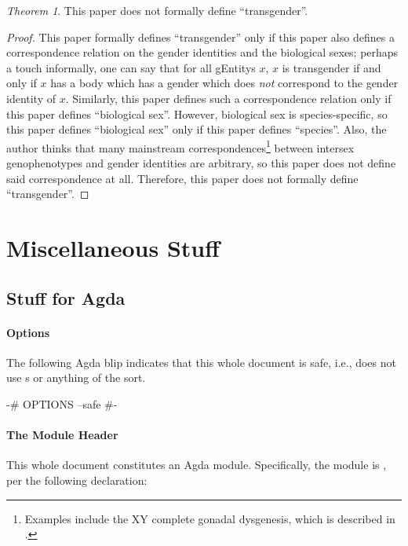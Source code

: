 \documentclass{article}
\theoremstyle{remark}
\newtheorem{theorem}{Theorem}
\begin{document}
\begin{theorem}
  This paper does not formally define ``transgender''.
\end{theorem}
\begin{proof}
  This paper formally defines ``transgender'' only if this paper also defines a correspondence relation on the gender identities and the biological sexes; perhaps a touch informally, one can say that for all \glspl{gEntity} \(x\), \(x\) is transgender if and only if \(x\) has a body which has a gender which does \emph{not} correspond to the gender identity of \(x\).  Similarly, this paper defines such a correspondence relation only if this paper defines ``biological sex''.  However, biological sex is species-specific,\cite{mooreWhiteThroatedSparrow} so this paper defines ``biological sex'' only if this paper defines ``species''.  Also, the author thinks that many mainstream correspondences\footnote{Examples include the XY complete gonadal dysgenesis, which is described in \textcite{wikipediaXyDysgenesis}.} between intersex genophenotypes and gender identities are arbitrary, so this paper does not define said correspondence at all.  Therefore, this paper does not formally define ``transgender''.
\end{proof}

\section{Miscellaneous Stuff}

\subsection{Stuff for Agda}

\paragraph{Options}
The following Agda blip indicates that this whole document is safe, i.e., does not use s or anything of the sort.

\begin{code}
{-# OPTIONS --safe #-}
\end{code}

\paragraph{The Module Header}
This whole document constitutes an Agda module.  Specifically, the module is , per the following declaration:
\end{document}
